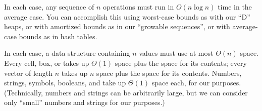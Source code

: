 \documentclass{article}
\begin{document}
In each case, any sequence of \(n\) operations must run in \(O(n \log n)\) time
in the average case.  You can accomplish this using worst-case bounds as with
our ``D'' heaps, or with amortized bounds as in our ``growable sequences'', or
with average-case bounds as in hash tables.

In each case, a data structure containing \(n\) values must use at most
\(\Theta(n)\) space.  Every  cell, box, or  takes up
\(\Theta(1)\) space plus the space for its contents; every vector of length
\(n\) takes up \(n\) space plus the space for its contents.  Numbers, strings,
symbols, booleans,  and  take up \(\Theta(1)\) space
each, for our purposes.  (Technically, numbers and strings can be arbitrarily
large, but we can consider only ``small'' numbers and strings for our purposes.)

\newcommand\ty[1]{\ensuremath{\mathit{#1}}}
\newcommand\isty{\ensuremath{~:~}}
\newcommand\Num{\ty{Number}}
\newcommand\Str{\ty{String}}
\newcommand\Key{\Num}
\newcommand\Val{\Str}
\newcommand\Elem{\Num}
\newcommand\Assoc{\ty{AssocMap}}
\newcommand\Set{\ty{Set}}
\newcommand\Q{\ty{Queue}}
\newcommand\X{\Str}
\newcommand\Bool{\ty{Boolean}}
\newcommand\U{\mbox{ or }}
\end{document}
